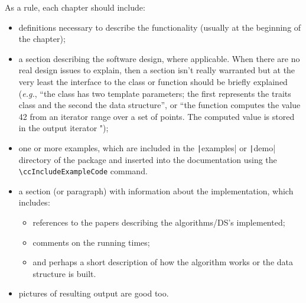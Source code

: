 As a rule, each chapter should include:
\begin{itemize}
 \item definitions necessary to describe the functionality (usually at the
       beginning of the chapter);

 \item a section describing the software design, where applicable.  When there
       are no real design issues to explain, then a section isn't really 
       warranted but at the very least the interface to the class or function 
       should be briefly explained (\textit{e.g.}, ``the class 
        has two template parameters; the first 
       represents the traits class and the second the data structure'', or 
       ``the function  computes the value 42 
        from an iterator range \ccc{[b, e)} over a set of points.  The 
        computed value is stored in the output iterator ");

  \item one or more examples, which are included in the \texttt|examples|
        or \texttt|demo| directory of the package and inserted into the
        documentation using the \verb|\ccIncludeExampleCode| command.

  \item a section (or paragraph) with information about the 
        implementation, which includes: 
        \begin{itemize}
          \item references to the papers describing the algorithms/DS's 
                implemented; 
          \item comments on the running times; 
          \item and perhaps a short description of how the algorithm works or 
                the data structure is built.
        \end{itemize}

  \item pictures of resulting output are good too.
\end{itemize}

